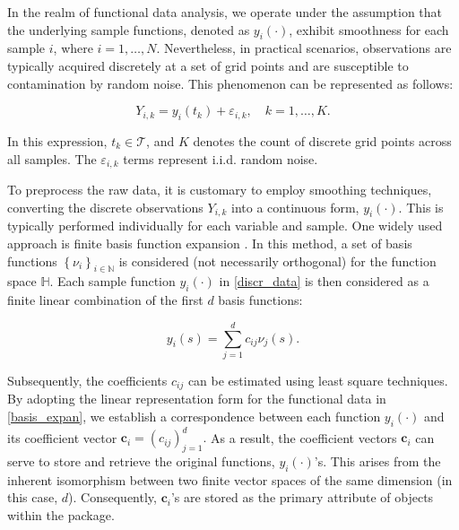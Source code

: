 In the realm of functional data analysis, we operate under the assumption that the underlying sample functions, denoted as $y_{i}(\cdot)$, exhibit smoothness for each sample $i$, where $i=1, \ldots, N$. Nevertheless, in practical scenarios, observations are typically acquired discretely at a set of grid points and are susceptible to contamination by random noise. This phenomenon can be represented as follows:

\begin{equation}\label{discr_data}

	Y_{i,k} = y_{i}(t_k) +\varepsilon_{i,k}, \quad k=1,\ldots, K.

\end{equation}

In this expression, $t_k\in\mathcal{T}$, and $K$ denotes the count of discrete grid points across all samples. The $\varepsilon_{i,k}$ terms represent i.i.d. random noise.

To preprocess the raw data, it is customary to employ smoothing techniques, converting the discrete observations $Y_{i,k}$ into a continuous form, $y_{i}(\cdot)$. This is typically performed individually for each variable and sample. One widely used approach is finite basis function expansion \citep{ramsay2005}. In this method, a set of basis functions $\left\lbrace \nu_i \right\rbrace_{ i\in\mathbb{N}}$ is considered (not necessarily orthogonal) for the function space $\mathbb{H}$. Each sample function $y_{i}(\cdot)$ in \eqref{discr_data} is then considered as a finite linear combination of the first $d$ basis functions:

\begin{equation}\label{basis_expan}

	y_i(s)= \sum_{j=1}^d c_{ij}\nu_j(s).

\end{equation}

Subsequently, the coefficients $c_{ij}$ can be estimated using least square techniques. By adopting the linear representation form for the functional data in \eqref{basis_expan}, we establish a correspondence between each function $y_i(\cdot)$ and its coefficient vector ${\pmb c}_i=(c_{ij})_{j=1}^d.$ As a result, the coefficient vectors ${\pmb c}_i$ can serve to store and retrieve the original functions, $y_i(\cdot)$'s. This arises from the inherent isomorphism between two finite vector spaces of the same dimension (in this case, $d$). Consequently, ${\pmb c}_i$'s are stored as the primary attribute of  objects within the  package.

